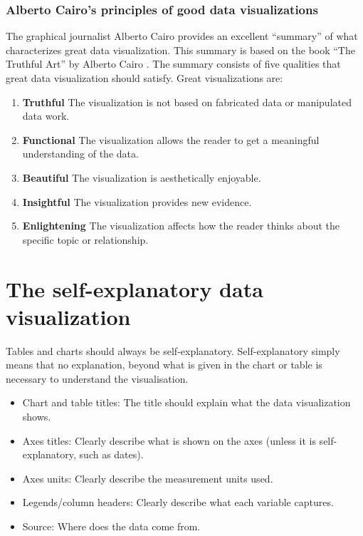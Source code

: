 \documentclass[
]{book}
\providecommand{\tightlist}{%
  \setlength{\itemsep}{0pt}\setlength{\parskip}{0pt}}
\begin{document}
\hypertarget{alberto-cairos-principles-of-good-data-visualizations}{%
\subsubsection*{Alberto Cairo's principles of good data visualizations}\label{alberto-cairos-principles-of-good-data-visualizations}}

The graphical journalist Alberto Cairo provides an excellent ``summary'' of what characterizes great data visualization. This summary is based on the book ``The Truthful Art'' by Alberto Cairo \citep{cairo}. The summary consists of five qualities that great data visualization should satisfy. Great visualizations are:

\begin{enumerate}
\def\labelenumi{\arabic{enumi}.}
\item
  \textbf{Truthful}
  The visualization is not based on fabricated data or manipulated data work.
\item
  \textbf{Functional}
  The visualization allows the reader to get a meaningful understanding of the data.
\item
  \textbf{Beautiful}
  The visualization is aesthetically enjoyable.
\item
  \textbf{Insightful}
  The visualization provides new evidence.
\item
  \textbf{Enlightening}
  The visualization affects how the reader thinks about the specific topic or relationship.
\end{enumerate}

\hypertarget{the-self-explanatory-data-visualization}{%
\section{The self-explanatory data visualization}\label{the-self-explanatory-data-visualization}}

Tables and charts should always be self-explanatory. Self-explanatory simply means that no explanation, beyond what is given in the chart or table is necessary to understand the visualisation.

\begin{itemize}
\tightlist
\item
  Chart and table titles: The title should explain what the data visualization shows.
\item
  Axes titles: Clearly describe what is shown on the axes (unless it is self-explanatory, such as dates).
\item
  Axes units: Clearly describe the measurement units used.
\item
  Legends/column headers: Clearly describe what each variable captures.
\item
  Source: Where does the data come from.
\end{itemize}
\end{document}
